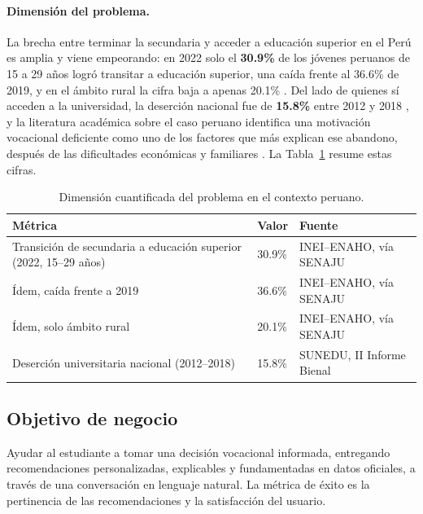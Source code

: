 \paragraph{Dimensi\'on del problema.} La brecha entre terminar la secundaria y
acceder a educaci\'on superior en el Per\'u es amplia y viene empeorando: en
2022 solo el \textbf{30.9\%} de los j\'ovenes peruanos de 15 a 29 a\~nos logr\'o
transitar a educaci\'on superior, una ca\'ida frente al 36.6\% de 2019, y en el
\'ambito rural la cifra baja a apenas 20.1\% \cite{senaju2024}. Del lado de
quienes s\'i acceden a la universidad, la deserci\'on nacional fue de
\textbf{15.8\%} entre 2012 y 2018 \cite{sunedu2020}, y la literatura acad\'emica
sobre el caso peruano identifica una motivaci\'on vocacional deficiente como uno
de los factores que m\'as explican ese abandono, despu\'es de las dificultades
econ\'omicas y familiares \cite{escalante2023}. La Tabla~\ref{tab:problem-scale}
resume estas cifras.

\begin{table}[H]
\centering
\begin{tabular}{@{}p{6cm}p{1.6cm}p{4.8cm}@{}}
\toprule
\textbf{M\'etrica} & \textbf{Valor} & \textbf{Fuente} \\
\midrule
Transici\'on de secundaria a educaci\'on superior (2022, 15--29 a\~nos) & 30.9\% & INEI--ENAHO, v\'ia SENAJU \cite{senaju2024} \\
\'{I}dem, ca\'ida frente a 2019 & 36.6\% & INEI--ENAHO, v\'ia SENAJU \cite{senaju2024} \\
\'{I}dem, solo \'ambito rural & 20.1\% & INEI--ENAHO, v\'ia SENAJU \cite{senaju2024} \\
Deserci\'on universitaria nacional (2012--2018) & 15.8\% & SUNEDU, II Informe Bienal \cite{sunedu2020} \\
\bottomrule
\end{tabular}
\caption{Dimensi\'on cuantificada del problema en el contexto peruano.}
\label{tab:problem-scale}
\end{table}

\subsection{Objetivo de negocio}

Ayudar al estudiante a tomar una decisi\'on vocacional informada, entregando
recomendaciones personalizadas, explicables y fundamentadas en datos oficiales,
a trav\'es de una conversaci\'on en lenguaje natural. La m\'etrica de \'exito es
la pertinencia de las recomendaciones y la satisfacci\'on del usuario.

